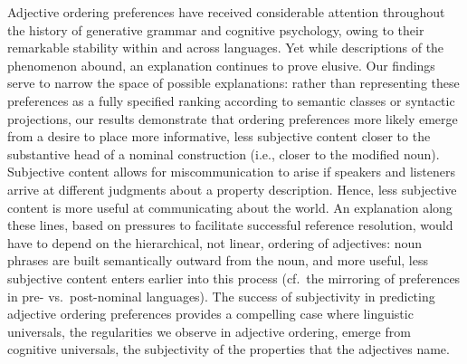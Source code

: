 \documentclass[10pt]{article}
\begin{document}

Adjective ordering preferences have received considerable attention throughout the history of generative grammar and cognitive psychology, owing to their remarkable stability within and across languages. %
Yet while descriptions of the phenomenon abound, an explanation continues to prove elusive. Our findings serve to narrow the space of possible explanations: rather than representing these preferences as a fully specified ranking according to semantic classes or syntactic projections, our results demonstrate that ordering preferences more likely emerge from a desire to place more informative, less subjective content closer to the substantive head of a nominal construction (i.e., closer to the modified noun). Subjective content allows for miscommunication to arise if speakers and listeners arrive at different judgments about a property description. Hence, less subjective content is more useful at communicating about the world. 
An explanation along these lines, based on pressures to facilitate successful reference resolution, 
would have to depend on the hierarchical, not linear, ordering of adjectives: noun phrases are built semantically outward from the noun, and more useful, less subjective content enters earlier into this process (cf.~the mirroring of preferences in pre- vs.~post-nominal languages). 
The success of subjectivity in predicting adjective ordering preferences provides a compelling case where linguistic universals, the regularities we observe in adjective ordering, emerge from cognitive universals, the subjectivity of the properties that the adjectives name.\\
\end{document}
